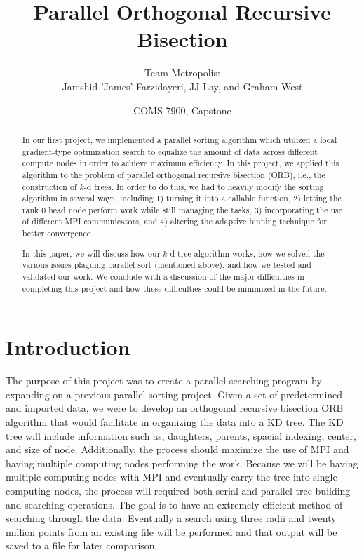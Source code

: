 \documentclass{article}
\begin{document}
\title{Parallel Orthogonal Recursive Bisection}
\author{Team Metropolis: \\
		Jamshid 'James' Farzidayeri, JJ Lay, and Graham West}
\date{COMS 7900, Capstone}

\maketitle

\begin{abstract}
In our first project, we implemented a parallel sorting algorithm which utilized a local gradient-type optimization search to equalize the amount of data across different compute nodes in order to achieve maximum efficiency. In this project, we applied this algorithm to the problem of parallel orthogonal recursive bisection (ORB), i.e., the construction of $k$-d trees. In order to do this, we had to heavily modify the sorting algorithm in several ways, including 1) turning it into a callable function, 2) letting the rank 0 head node perform work while still managing the tasks, 3) incorporating the use of different MPI communicators, and 4) altering the adaptive binning technique for better convergence.

In this paper, we will discuss how our $k$-d tree algorithm works, how we solved the various issues plaguing parallel sort (mentioned above), and how we tested and validated our work. We conclude with a discussion of the major difficulties in completing this project and how these difficulties could be minimized in the future.
\end{abstract}


\tableofcontents


\section{Introduction}

The purpose of this project was to create a parallel searching program by expanding on a previous parallel sorting project. Given a set of predetermined and imported data, we were to develop an orthogonal recursive bisection ORB algorithm that would facilitate in organizing the data into a KD tree. The KD tree will include information such as, daughters, parents, spacial indexing, center, and size of node. Additionally, the process should maximize the use of MPI and having multiple computing nodes performing the work. Because we will be having multiple computing nodes with MPI and eventually carry the tree into single computing nodes, the process will required both serial and parallel tree building and searching operations. The goal is to have an extremely efficient method of searching through the data. Eventually a search using three radii and twenty million points from an existing file will be performed and that output will be saved to a file for later comparison.
\end{document}
